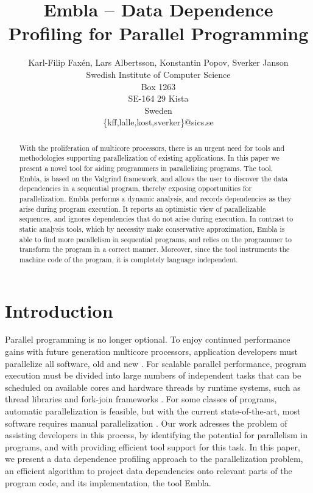 \documentclass{acm_proc_article-sp}
\begin{document}
\title{Embla -- Data Dependence Profiling for Parallel Programming }
\author{Karl-Filip Fax\'en, Lars Albertsson, Konstantin Popov, Sverker Janson\\
       Swedish Institute of Computer Science\\
       Box 1263\\
       SE-164 29 Kista\\
       Sweden\\
       \{kff,lalle,kost,sverker\}@sics.se}
\date{}
\maketitle

\begin{abstract}

With the proliferation of multicore processors, there is an urgent need for
tools and methodologies supporting parallelization of existing
applications.  In this paper we present a novel tool for aiding
programmers in parallelizing programs. The tool, Embla, is based on the
Valgrind framework, and allows the user to
discover the data dependencies in a sequential program, thereby exposing
opportunities for parallelization.   Embla performs a dynamic analysis,
and records dependencies as they
arise during program execution.  It reports an optimistic view of
parallelizable sequences, and ignores dependencies that do not arise during
execution.  In contrast to static analysis tools,
which by necessity make conservative approximation, Embla is able to find
more parallelism in sequential programs, and relies on the programmer to
transform the program in a correct manner. 
Moreover, since the tool instruments the machine code of the program,
it is completely language independent. 

\end{abstract}


\section{Introduction}

Parallel programming is no longer optional.  To enjoy continued
performance gains with future generation multicore processors,
application developers must parallelize all software, old and new
\cite{TEL95,ONHWC96,KAB03,Sutter05}.  For scalable parallel
performance, program execution must be divided into large numbers of
independent tasks that can be scheduled on available cores and
hardware threads by runtime systems, such as thread libraries and
fork-join frameworks \cite{}.  For some classes of programs, automatic
parallelization is feasible, but with the current state-of-the-art,
most software requires manual parallelization \cite{}.  Our work
adresses the problem of assisting developers in this process, by
identifying the potential for parallelism in programs, and with
providing efficient tool support for this task.  In this paper, we
present a data dependence profiling approach to the parallelization
problem, an efficient algorithm to project data dependencies onto
relevant parts of the program code, and its implementation, the tool
Embla.
\end{document}
